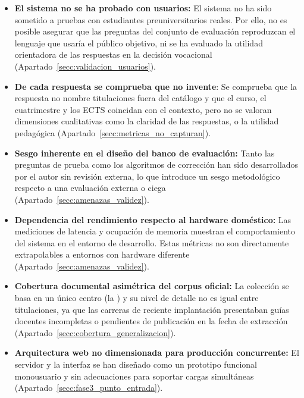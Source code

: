 \begin{itemize}
  \item \textbf{El sistema no se ha probado con
      usuarios:} El sistema no ha sido sometido a pruebas con estudiantes preuniversitarios reales. Por ello, no es posible asegurar que las preguntas del conjunto de evaluación reproduzcan el lenguaje que usaría el público objetivo, ni se ha evaluado la utilidad orientadora de las respuestas en la decisión vocacional 
    (Apartado~\ref{secc:validacion_usuarios}).

  \item \textbf{De cada respuesta se comprueba que no
      invente}: Se comprueba que la respuesta no nombre titulaciones fuera del catálogo y que el curso, el cuatrimestre y los ECTS coincidan con el contexto, pero no se valoran dimensiones cualitativas como la claridad de las respuestas, o la utilidad pedagógica 
    (Apartado~\ref{secc:metricas_no_capturan}).

  \item \textbf{Sesgo inherente en el diseño del banco de evaluación:} Tanto las preguntas de prueba como los algoritmos de corrección han sido desarrollados por el autor sin revisión externa, lo que introduce un sesgo metodológico respecto a una evaluación externa o ciega
    (Apartado~\ref{secc:amenazas_validez}).

  \item \textbf{Dependencia del rendimiento respecto al hardware doméstico:} Las mediciones de latencia y ocupación de memoria muestran el comportamiento del sistema en el entorno de desarrollo. Estas métricas no son directamente extrapolables a entornos con hardware diferente 
    (Apartado~\ref{secc:amenazas_validez}).

  \item \textbf{Cobertura documental asimétrica del corpus oficial:} La colección se basa en un único centro (la ) y su nivel de detalle no es igual entre titulaciones, ya que las carreras de reciente implantación presentaban guías docentes incompletas o pendientes de publicación en la fecha de extracción (Apartado~\ref{secc:cobertura_generalizacion}).

  \item \textbf{Arquitectura web no dimensionada para producción concurrente:} El servidor y la interfaz se han diseñado como un prototipo funcional monousuario y sin adecuaciones para soportar cargas simultáneas (Apartado~\ref{secc:fase3_punto_entrada}).
\end{itemize}


